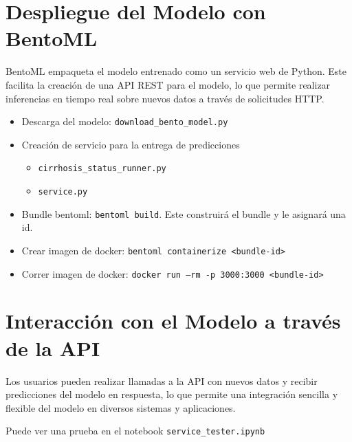 \documentclass[11pt,a4paper]{report}
\begin{document}
\section*{Despliegue del Modelo con BentoML}
BentoML empaqueta el modelo entrenado como un servicio web de Python. Este facilita la creación de una API REST para el modelo, lo que permite realizar inferencias en tiempo real sobre nuevos datos a través de solicitudes HTTP.

\begin{itemize}
    \item Descarga del modelo: \texttt{download\_bento\_model.py}
    \item Creación de servicio para la entrega de predicciones
    \begin{itemize}
        \item \texttt{cirrhosis\_status\_runner.py}
        \item \texttt{service.py}
    \end{itemize}
    \item Bundle bentoml: \texttt{bentoml build}. Este construirá el bundle y le asignará una id.
    \item Crear imagen de docker: \texttt{bentoml containerize <bundle-id>}
    \item Correr imagen de docker: \texttt{docker run --rm -p 3000:3000 <bundle-id>}
\end{itemize}


\section*{Interacción con el Modelo a través de la API}
Los usuarios pueden realizar llamadas a la API con nuevos datos y recibir predicciones del modelo en respuesta, lo que permite una integración sencilla y flexible del modelo en diversos sistemas y aplicaciones.

Puede ver una prueba en el notebook \texttt{service\_tester.ipynb}





\cite{playground-series-s3e26}

\end{document}
